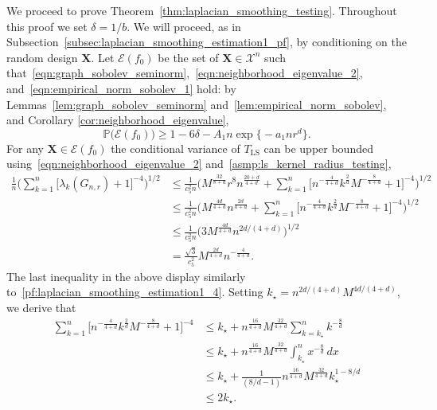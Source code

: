 \documentclass{article}
\newcommand{\1}{\mathbf{1}}
\newcommand{\Xset}{\mathcal{X}}
\newcommand{\mc}[1]{\mathcal{#1}}
\newcommand{\Pbb}{\mathbb{P}}
\newcommand{\LS}{\mathrm{LS}}
\theoremstyle{alden}
\theoremstyle{aldenthm}
\theoremstyle{definition}
\theoremstyle{remark}
\begin{document}
We proceed to prove Theorem~\ref{thm:laplacian_smoothing_testing}. Throughout this proof we set $\delta = 1/b$. We will proceed, as in Subsection~\ref{subsec:laplacian_smoothing_estimation1_pf}, by conditioning on the random design $\mathbf{X}$. Let $\mc{E}(f_0)$ be the set of $\mathbf{X} \in \Xset^n$ such that~\eqref{eqn:graph_sobolev_seminorm},~\eqref{eqn:neighborhood_eigenvalue_2}, and~\eqref{eqn:empirical_norm_sobolev_1} hold: by Lemmas~\ref{lem:graph_sobolev_seminorm} and~\ref{lem:empirical_norm_sobolev}, and Corollary \ref{cor:neighborhood_eigenvalue},
\begin{equation*}
\Pbb\bigl(\mc{E}(f_0)\bigr) \geq 1 - 6\delta - A_1n\exp\bigl\{-a_1nr^d\bigr\}. 
\end{equation*}
For any $\mathbf{X} \in \mc{E}(f_0)$ the conditional variance of $T_{\LS}$ can be upper bounded using~\eqref{eqn:neighborhood_eigenvalue_2} and~\ref{asmp:ls_kernel_radius_testing},
\begin{align*}
\frac{1}{n} \biggl(\sum_{k = 1}^{n} \bigl[\lambda_k(G_{n,r}) + 1\bigr]^{-4}\biggr)^{1/2} & \leq \frac{1}{c_5^2 n} \biggl(M^{\frac{32}{8 + d}}r^8n^{\frac{20+d}{4+d}} + \sum_{k = 1}^{n} \bigl[n^{-\frac{4}{4 + d}}k^{\frac{2}{d}}M^{-\frac{8}{4 + d}} + 1\bigr]^{-4}\biggr)^{1/2} \\
& \leq \frac{1}{c_5^2 n} \biggl(M^{\frac{4d}{4 + d}}n^{\frac{2d}{4 + d}} + \sum_{k = 1}^{n} \bigl[n^{-\frac{4}{4 + d}}k^{\frac{2}{d}}M^{-\frac{8}{4 + d}} + 1\bigr]^{-4}\biggr)^{1/2} \\
& \leq \frac{1}{c_5^2 n} \biggl(3 M^{\frac{4d}{4 + d}}n^{2d/(4 + d)}\biggr)^{1/2} \\
& = \frac{\sqrt{3}}{c_5^2} M^{\frac{2d}{4 + d}} n^{-\frac{4}{4 + d}}.
\end{align*}
The last inequality in the above display similarly to~\eqref{pf:laplacian_smoothing_estimation1_4}. Setting $k_{\star} = n^{2d/(4+d)}M^{4d/(4 + d)}$, we derive that
\begin{equation}
\begin{aligned}
\label{pf:laplacian_smooting_testing1}
\sum_{k = 1}^{n} \bigl[n^{-\frac{4}{4 + d}}k^{\frac{2}{d}}M^{-\frac{8}{4 + d}} + 1\bigr]^{-4} & \leq k_{\star} + n^{\frac{16}{4 + d}} M^{\frac{32}{4 + d}}\sum_{k = k_{\star}}^{n} k^{-\frac{8}{d}}\\
& \leq k_{\star} + n^{\frac{16}{4 + d}} M^{\frac{32}{4 + d}} \int_{k_{\star}}^{n} x^{-\frac{8}{d}} \,dx \\
& \leq  k_{\star} + \frac{1}{(8/d - 1)}n^{\frac{16}{4 + d}} M^{\frac{32}{4 + d}} k_{\star}^{1 - 8/d} \\
& \leq 2k_{\star}.
\end{aligned}
\end{equation}
\end{document}
